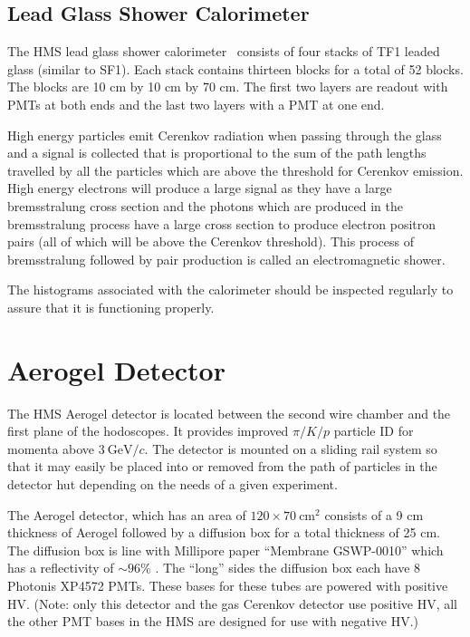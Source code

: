 {\subsection{Lead Glass Shower Calorimeter}

The HMS lead glass shower
calorimeter~\cite{Mkrtchyan201385Mkrtchyan201385}
consists of four stacks of
TF1 leaded glass (similar to SF1). Each stack contains thirteen
blocks for a total of 52 blocks. The blocks are 10 cm by 10 cm by 70
cm.  The first two layers are readout with PMTs at both ends and the
last two layers with a PMT at one end.

High energy particles
emit Cerenkov radiation when passing through the glass and a signal
is collected that is proportional to the sum of the path lengths
travelled by all the
particles which are above the threshold for Cerenkov emission. High energy
electrons will produce a large signal as they have a large bremsstralung
cross section and the photons which are produced in the bremsstralung
process have a large cross section to produce electron positron pairs
(all of which will be above the Cerenkov threshold). This process
of bremsstralung followed by pair production is called an electromagnetic
shower.

The histograms associated with the calorimeter should be inspected
regularly to assure that it is functioning properly.

\section{Aerogel Detector}
The HMS Aerogel detector\cite{Asaturyan2005364} is located between the
second wire chamber and the first plane of the hodoscopes.  It
provides improved $\pi/K/p$ particle ID for momenta above
$3~\textrm{GeV}/c$.  The detector is mounted on a sliding rail system
so that it may easily be placed into or removed from the path of
particles in the detector hut depending on the needs of a given
experiment.

The Aerogel detector, which has an area of $120\times
70~\textrm{cm}^2$ consists of a 9 cm thickness of Aerogel followed by a
diffusion box for a total thickness of 25 cm. The diffusion box is
line with Millipore paper ``Membrane GSWP-0010'' which has a
reflectivity of $\sim 96\%$ \cite{millipore}.   The ``long'' sides the diffusion
box each have 8 Photonis XP4572 PMTs.  These bases for these tubes are
powered with positive HV.
(Note: only this detector and the gas Cerenkov detector
use positive HV, all the other PMT bases in the HMS are designed for
use with negative HV.)

}
